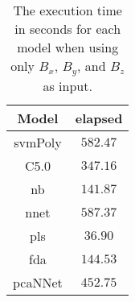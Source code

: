 \begin{table}[!ht]
	\centering
	\begin{tabular}{|c|c|}
		\hline
		Model & elapsed \\ \hline
		svmPoly & $582.47$ \\ \hline
		C5.0 & $347.16$ \\ \hline
		nb & $141.87$ \\ \hline
		nnet & $587.37$ \\ \hline
		pls & $36.90$ \\ \hline
		fda & $144.53$ \\ \hline
		pcaNNet & $452.75$ \\ \hline
	\end{tabular}
	\caption{The execution time in seconds for each model when using only $B_{x}$, $B_{y}$, and $B_{z}$ as input.}
	\label{tab:time:coord:total}
\end{table}
